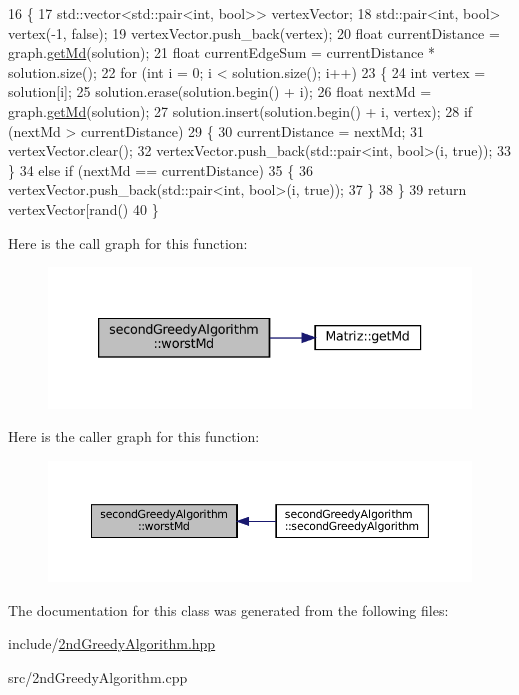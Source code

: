 \begin{DoxyCode}
16 \{
17   std::vector<std::pair<int, bool>> vertexVector;
18   std::pair<int, bool> vertex(-1, \textcolor{keyword}{false});
19   vertexVector.push\_back(vertex);
20   \textcolor{keywordtype}{float} currentDistance = graph.\hyperlink{classMatriz_a8df14a27d791f24206dd633b2a685c5b}{getMd}(solution);
21   \textcolor{keywordtype}{float} currentEdgeSum = currentDistance * solution.size();
22   \textcolor{keywordflow}{for} (\textcolor{keywordtype}{int} i = 0; i < solution.size(); i++)
23   \{
24     \textcolor{keywordtype}{int} vertex = solution[i];
25     solution.erase(solution.begin() + i);
26     \textcolor{keywordtype}{float} nextMd = graph.\hyperlink{classMatriz_a8df14a27d791f24206dd633b2a685c5b}{getMd}(solution);
27     solution.insert(solution.begin() + i, vertex);
28     \textcolor{keywordflow}{if} (nextMd > currentDistance)
29     \{
30       currentDistance = nextMd;
31       vertexVector.clear();
32       vertexVector.push\_back(std::pair<int, bool>(i, \textcolor{keyword}{true}));
33     \}
34     \textcolor{keywordflow}{else} \textcolor{keywordflow}{if} (nextMd == currentDistance)
35     \{
36       vertexVector.push\_back(std::pair<int, bool>(i, \textcolor{keyword}{true}));
37     \}
38   \}
39   \textcolor{keywordflow}{return} vertexVector[rand() %
40 \}
\end{DoxyCode}
Here is the call graph for this function\+:
\nopagebreak
\begin{figure}[H]
\begin{center}
\leavevmode
\includegraphics[width=333pt]{classsecondGreedyAlgorithm_a714fa858b1666fc77153890ac16f1b3f_cgraph}
\end{center}
\end{figure}
Here is the caller graph for this function\+:
\nopagebreak
\begin{figure}[H]
\begin{center}
\leavevmode
\includegraphics[width=350pt]{classsecondGreedyAlgorithm_a714fa858b1666fc77153890ac16f1b3f_icgraph}
\end{center}
\end{figure}


The documentation for this class was generated from the following files\+:\begin{DoxyCompactItemize}
\item 
include/\hyperlink{2ndGreedyAlgorithm_8hpp}{2nd\+Greedy\+Algorithm.\+hpp}\item 
src/2nd\+Greedy\+Algorithm.\+cpp\end{DoxyCompactItemize}
